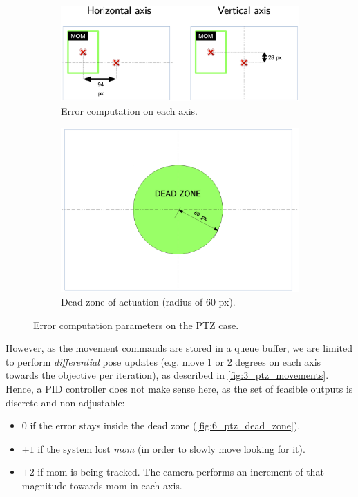 	
	\begin{figure}[h]
		\centering
		\begin{subfigure}[b]{0.6\linewidth}
			\centering
			\includegraphics[width=4in]{images/ptz_error_comp}
			\caption{Error computation on each axis.}
			\label{fig:6_ptz_error}
		\end{subfigure}
		\hfill
		\begin{subfigure}[b]{0.5\linewidth}
			\centering
			\includegraphics[width=4in]{images/ptz_dead_zone}
			\caption{Dead zone of actuation (radius of 60 px).}
			\label{fig:6_ptz_dead_zone}
		\end{subfigure}
		\caption{Error computation parameters on the PTZ case.}
		\label{fig:6_ptz_parameters}
	\end{figure}
	
	However, as the movement commands are stored in a queue buffer, we are limited to perform \emph{differential} pose updates (e.g. move 1 or 2 degrees on each axis towards the objective per iteration), as described in \autoref{fig:3_ptz_movements}. Hence, a PID controller does not make sense here, as the set of feasible outputs is discrete and non adjustable:
	\begin{itemize}
		\item $0$ if the error stays inside the dead zone (\autoref{fig:6_ptz_dead_zone}).
		
		\item $\pm 1$ if the system lost \emph{mom} (in order to slowly move looking for it).
		
		\item $\pm 2$ if mom is being tracked. The camera performs an increment of that magnitude towards mom in each axis.
	\end{itemize}
	


